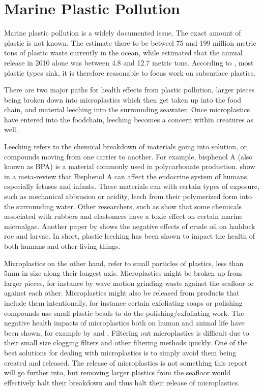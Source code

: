 \documentclass[class=article, crop=false]{standalone}
\begin{document}
\section{Marine Plastic Pollution}
Marine plastic pollution is a widely documented issue. The exact amount of plastic is not known. The \citet{world_economic_forum_top_2022} estimate there to be betweel 75 and 199 million metric tons of plastic waste currently in the ocean, while \citet{jambeck_plastic_2015} estimated that the annual release in 2010 alone was between 4.8 and 12.7 metric tons. According to \citet{isobe_fate_2022}, most plastic types sink, it is therefore reasonable to focus work on subsurface plastics.

There are two major paths for health effects from plastic pollution, larger pieces being broken down into microplastics which then get taken up into the food chain, and material leeching into the surrounding seawater. Once microplastics have entered into the foodchain, leeching becomes a concern within creatures as well.

Leeching refers to the chemical breakdown of materials going into solution, or compounds moving from one carrier to another. For example, bisphenol A (also known as BPA) is a material commonly used in polycarbonate production. \citet{rochester_bisphenol_2013} show in a meta-review that Bisphenol A can affect the endocrine system of humans, especially fetuses and infants. These materials can with certain types of exposure, such as mechanical abbrasion or acidity, leech from their polymerized form into the surrounding water. Other researchers, such as \citet{sorensen_organic_2023}\cite{sorensen_organic_2023} show that some chemicals associated with rubbers and elastomers have a toxic effect on certain marine microalgae. Another paper by \citet{sorhus_crude_2023}\cite{sorhus_crude_2023]} shows the negative effects of crude oil on haddock roe and larvae. In short, plastic leeching has been shown to impact the health of both humans and other living things.

Microplastics on the other hand, refer to small particles of plastics, less than 5mm in size along their longest axis. Microplastics might be broken up from larger pieces, for instance by wave motion grinding waste against the seafloor or against each other. Microplastics might also be released from products that include them intentionally, for instance certain exfoliating soaps or polishing compounds use small plastic beads to do the polishing/exfoliating work. The negative health impacts of microplastics both on human and animal life have been shown, for example by \citet{segovia-mendoza_how_2020} and \citet{zolotova_harmful_2022}. Filtering out microplastics is difficult due to their small size clogging filters and other filtering methods quickly. One of the best solutions for dealing with microplastics is to simply avoid them being created and released. The release of microplastics is not something this report will go further into, but removing larger plastics from the seafloor would effectively halt their breakdown and thus halt their release of microplastics.
\end{document}
